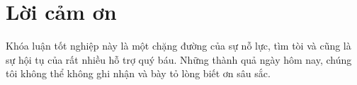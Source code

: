 \chapter*{\centering\Large{Lời cảm ơn}}





 Khóa luận tốt nghiệp này là một chặng đường của sự nỗ lực, tìm tòi và cũng là sự hội tụ của rất nhiều hỗ trợ quý báu. Những thành quả ngày hôm nay, chúng tôi không thể không ghi nhận và bày tỏ lòng biết ơn sâu sắc.

